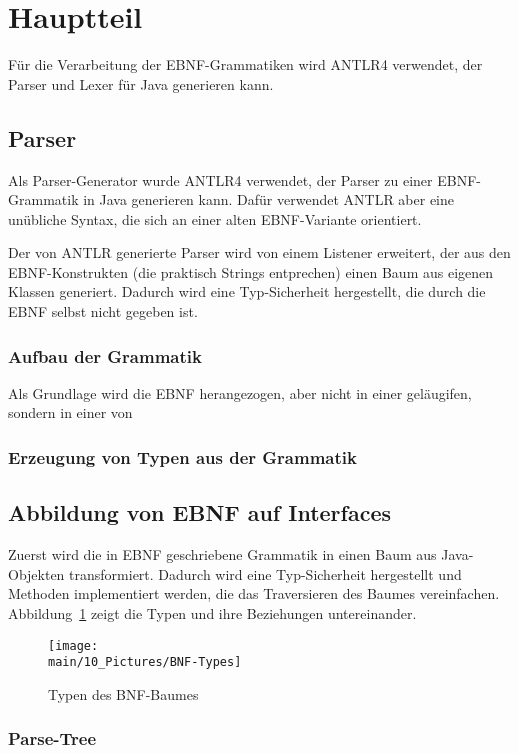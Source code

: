 \documentclass[../InterneDSLs.tex]{subfiles}
\begin{document}
\section{Hauptteil}
Für die Verarbeitung der \ac{EBNF}-Grammatiken wird ANTLR4 verwendet, der Parser und Lexer für Java generieren kann.

\subsection{Parser}
Als Parser-Generator wurde ANTLR4 verwendet, der Parser zu einer EBNF-Grammatik in Java generieren kann. Dafür verwendet ANTLR aber eine unübliche Syntax, die sich an einer alten EBNF-Variante orientiert.

Der von ANTLR generierte Parser wird von einem Listener erweitert, der aus den EBNF-Konstrukten (die praktisch Strings entprechen) einen Baum aus eigenen Klassen generiert. Dadurch wird eine Typ-Sicherheit hergestellt, die durch die EBNF selbst nicht gegeben ist.

\subsubsection{Aufbau der Grammatik}
Als Grundlage wird die EBNF herangezogen, aber nicht in einer geläugifen, sondern in einer von 

\subsubsection{Erzeugung von Typen aus der Grammatik}


\subsection{Abbildung von EBNF auf Interfaces}
Zuerst wird die in EBNF geschriebene Grammatik in einen Baum aus Java-Objekten transformiert. Dadurch wird eine Typ-Sicherheit hergestellt und Methoden implementiert werden, die das Traversieren des Baumes vereinfachen. Abbildung~\ref{FIG:TypesBNF} zeigt die Typen und ihre Beziehungen untereinander.

\begin{figure}[ht]
\centering
\texttt{[image: \\main/10\_Pictures/BNF-Types]}
\caption{Typen des BNF-Baumes}
\label{FIG:TypesBNF}
\end{figure}

\subsubsection{Parse-Tree}
\end{document}
